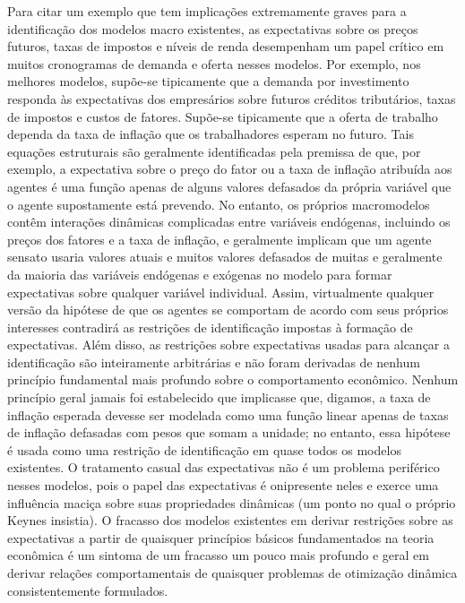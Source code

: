\documentclass[12pt]{article}
\begin{document}
Para citar um exemplo que tem implicações extremamente graves para a identificação dos modelos macro existentes, as expectativas sobre os preços futuros, taxas de impostos e níveis de renda desempenham um papel crítico em muitos cronogramas de demanda e oferta nesses modelos. Por exemplo, nos melhores modelos, supõe-se tipicamente que a demanda por investimento responda às expectativas dos empresários sobre futuros créditos tributários, taxas de impostos e custos de fatores. Supõe-se tipicamente que a oferta de trabalho dependa da taxa de inflação que os trabalhadores esperam no futuro. Tais equações estruturais são geralmente identificadas pela premissa de que, por exemplo, a expectativa sobre o preço do fator ou a taxa de inflação atribuída aos agentes é uma função apenas de alguns valores defasados da própria variável que o agente supostamente está prevendo. No entanto, os próprios macromodelos contêm interações dinâmicas complicadas entre variáveis endógenas, incluindo os preços dos fatores e a taxa de inflação, e geralmente implicam que um agente sensato usaria valores atuais e muitos valores defasados de muitas e geralmente da maioria das variáveis endógenas e exógenas no modelo para formar expectativas sobre qualquer variável individual. Assim, virtualmente qualquer versão da hipótese de que os agentes se comportam de acordo com seus próprios interesses contradirá as restrições de identificação impostas à formação de expectativas. Além disso, as restrições sobre expectativas usadas para alcançar a identificação são inteiramente arbitrárias e não foram derivadas de nenhum princípio fundamental mais profundo sobre o comportamento econômico. Nenhum princípio geral jamais foi estabelecido que implicasse que, digamos, a taxa de inflação esperada devesse ser modelada como uma função linear apenas de taxas de inflação defasadas com pesos que somam a unidade; no entanto, essa hipótese é usada como uma restrição de identificação em quase todos os modelos existentes. O tratamento casual das expectativas não é um problema periférico nesses modelos, pois o papel das expectativas é onipresente neles e exerce uma influência maciça sobre suas propriedades dinâmicas (um ponto no qual o próprio Keynes insistia). O fracasso dos modelos existentes em derivar restrições sobre as expectativas a partir de quaisquer princípios básicos fundamentados na teoria econômica é um sintoma de um fracasso um pouco mais profundo e geral em derivar relações comportamentais de quaisquer problemas de otimização dinâmica consistentemente formulados.
\end{document}
